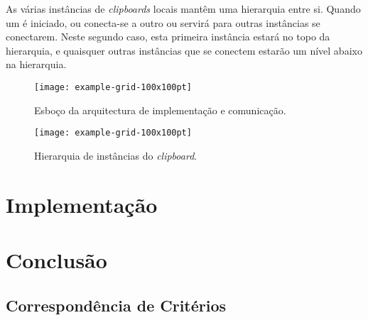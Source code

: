 \documentclass{article}
\begin{document}
As várias instâncias de \textit{clipboards} locais mantêm uma hierarquia
entre si. Quando um  é iniciado, ou conecta-se a outro ou
servirá para outras instâncias se conectarem. Neste segundo caso, esta
primeira instância estará no topo da hierarquia, e quaisquer outras
instâncias que se conectem estarão um nível abaixo na hierarquia.

\begin{figure}[ht]
	\centering
	\texttt{[image: example-grid-100x100pt]}
	\caption{Esboço da arquitectura de implementação e comunicação.}
	\label{fig:scheme_main}
\end{figure}

\begin{figure}[ht]
	\centering
	\texttt{[image: example-grid-100x100pt]}
	\caption{Hierarquia de instâncias do \textit{clipboard}.}
	\label{fig:hierarchy}
\end{figure}

\section{Implementação}

\section{Conclusão}

\subsection{Correspondência de Critérios}
\end{document}
